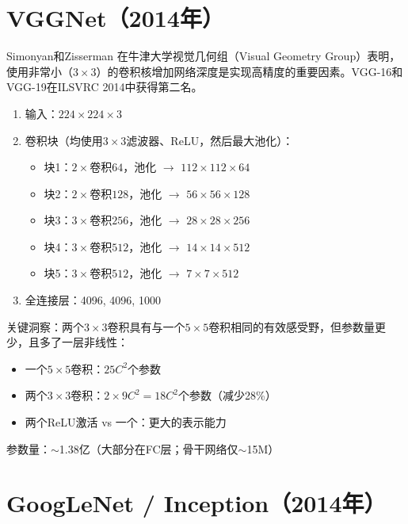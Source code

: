 \section{VGGNet（2014年）}

Simonyan和Zisserman \cite{simonyan2014very}在牛津大学视觉几何组（Visual Geometry Group）表明，使用非常小（$3\times3$）的卷积核增加网络深度是实现高精度的重要因素。VGG-16和VGG-19在ILSVRC 2014中获得第二名。

\begin{architecture}[VGG-16架构]
\begin{enumerate}
    \item 输入：$224\times224\times3$
    \item 卷积块（均使用$3\times3$滤波器、ReLU，然后最大池化）：
    \begin{itemize}
        \item 块1：$2\times$卷积$64$，池化 $\rightarrow$ $112\times112\times64$
        \item 块2：$2\times$卷积$128$，池化 $\rightarrow$ $56\times56\times128$
        \item 块3：$3\times$卷积$256$，池化 $\rightarrow$ $28\times28\times256$
        \item 块4：$3\times$卷积$512$，池化 $\rightarrow$ $14\times14\times512$
        \item 块5：$3\times$卷积$512$，池化 $\rightarrow$ $7\times7\times512$
    \end{itemize}
    \item 全连接层：4096, 4096, 1000
\end{enumerate}
\end{architecture}

关键洞察：两个$3\times3$卷积具有与一个$5\times5$卷积相同的有效感受野，但参数量更少，且多了一层非线性：
\begin{itemize}
    \item 一个$5\times5$卷积：$25C^2$个参数
    \item 两个$3\times3$卷积：$2 \times 9C^2 = 18C^2$个参数（减少28\%）
    \item 两个ReLU激活 vs 一个：更大的表示能力
\end{itemize}

参数量：$\sim$1.38亿（大部分在FC层；骨干网络仅$\sim$15M）

\section{GoogLeNet / Inception（2014年）}

